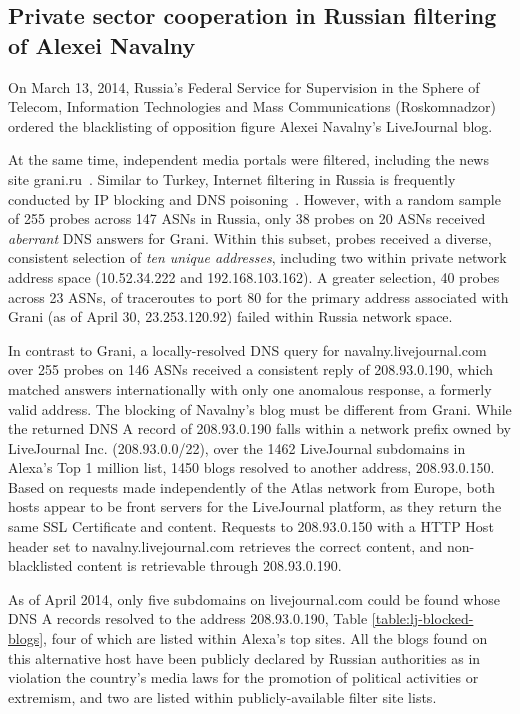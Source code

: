 \subsection{Private sector cooperation in Russian filtering of Alexei Navalny}
\label{sec:russia}

On March 13, 2014, Russia's Federal Service for Supervision in the
Sphere of Telecom, Information Technologies and Mass Communications
(Roskomnadzor) ordered the blacklisting of opposition figure Alexei
Navalny's LiveJournal blog.

At the same time, independent media portals were filtered, including the
news site grani.ru~\cite{ibtimes2014russia}.  Similar to Turkey,
Internet filtering in Russia is frequently conducted by IP blocking and
DNS poisoning~\cite{rugovdns,verkamp2012inferring}.  However, with a
random sample of 255 probes across 147 ASNs in Russia, only 38 probes on
20 ASNs received \emph{aberrant} DNS answers for Grani. Within this subset,
probes received a diverse, consistent selection of \emph{ten unique
addresses}, including two within private network address space
(10.52.34.222 and 192.168.103.162). A greater selection, 40 probes
across 23 ASNs, of traceroutes to port 80 for the primary address
associated with Grani (as of April 30, 23.253.120.92) failed within
Russia network space. 

In contrast to Grani, a locally-resolved DNS query for
navalny.livejournal.com over 255 probes on 146 ASNs received a
consistent reply of 208.93.0.190, which matched answers internationally
with only one anomalous response, a formerly valid address. The blocking
of Navalny's blog must be different from Grani. While the returned DNS A
record of 208.93.0.190 falls within a network prefix owned by
LiveJournal Inc. (208.93.0.0/22), over the 1462 LiveJournal subdomains
in Alexa's Top 1 million list, 1450 blogs resolved to another address,
208.93.0.150. Based on requests made independently of the Atlas network
from Europe, both hosts appear to be front servers for the LiveJournal
platform, as they return the same SSL Certificate and content. Requests
to 208.93.0.150 with a HTTP Host header set to navalny.livejournal.com
retrieves the correct content, and non-blacklisted content is
retrievable through 208.93.0.190.

As of April 2014, only five subdomains on livejournal.com could be found
whose DNS A records resolved to the address 208.93.0.190, Table
\ref{table:lj-blocked-blogs}, four of which are listed within Alexa's
top sites. All the blogs found on this alternative host have been
publicly declared by Russian authorities as in violation the country's
media laws for the promotion of political activities or extremism, and
two are listed within publicly-available filter site lists. 

